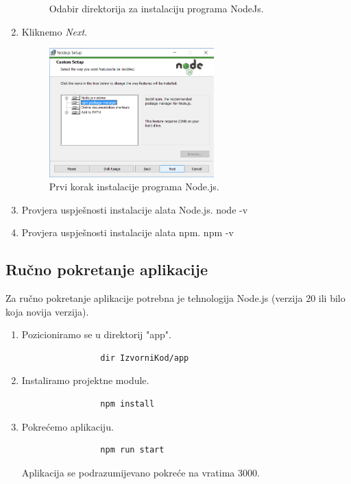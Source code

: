 \begin{enumerate}
\begin{figure}[h]
				\caption{Odabir direktorija za instalaciju programa NodeJs.}
				\label{fig:node_install_images}
			\end{figure}
			\item Kliknemo \textit{Next}.
			\begin{figure}[h]
				\centering
				\includegraphics[width=0.6\textwidth]{slike/npm_install/3.png}
				\caption{Prvi korak instalacije programa Node.js.}
				\label{fig:node_install_images}
			\end{figure}
			\item Provjera uspješnosti instalacije alata Node.js.
			 \subitem node -v
			\item Provjera uspješnosti instalacije alata npm.
			\subitem npm -v
		\end{enumerate}
		\subsection*{Ručno pokretanje aplikacije}
		Za ručno pokretanje aplikacije potrebna je tehnologija Node.js (verzija 20 ili bilo koja novija verzija).
		\begin{enumerate}
			\item Pozicioniramo se u direktorij "app".
			\begin{verbatim}
				dir IzvorniKod/app 
			\end{verbatim}
			\item Instaliramo projektne module.
			\begin{verbatim}
				npm install
			\end{verbatim}
			\item Pokrećemo aplikaciju.
			\begin{verbatim}
				npm run start
			\end{verbatim}
			Aplikacija se podrazumijevano pokreće na vratima 3000.
		\end{enumerate}
		\newpage
